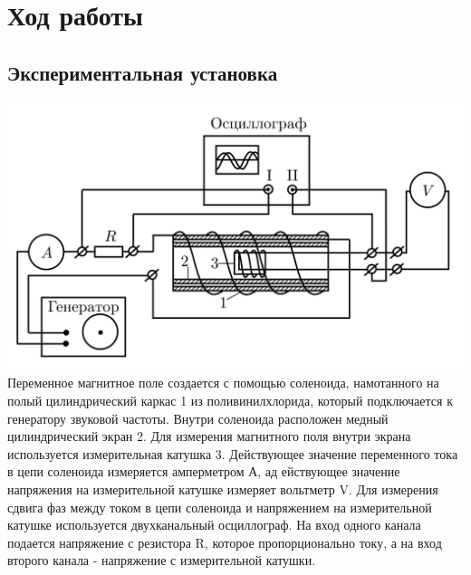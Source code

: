 \documentclass[a4paper]{article}
\begin{document}
\section{Ход работы}
\subsection{Экспериментальная установка}
\includegraphics[width=15cm]{g1}\\
Переменное магнитное поле создается с помощью соленоида, намотанного на полый цилиндрический каркас 1 из поливинилхлорида, который подключается к генератору звуковой частоты. Внутри соленоида расположен медный цилиндрический экран 2. Для измерения магнитного поля внутри экрана используется измерительная катушка 3. Действующее значение переменного тока в цепи соленоида измеряется амперметром А, ад ействующее значение напряжения на измерительной катушке измеряет вольтметр V. Для измерения сдвига фаз между током в цепи соленоида и напряжением на измерительной катушке используется двухканальный осциллограф. На вход одного канала подается напряжение с резистора R, которое пропорционально току, а на вход второго канала - напряжение с измерительной катушки. \\
\end{document}
